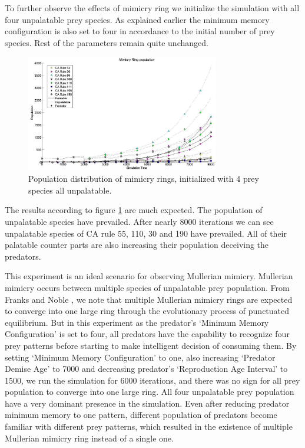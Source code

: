 \documentclass[letterpaper]{article}
\numberwithin{equation}{section}
\begin{document}
To further observe the effects of mimicry ring we initialize the simulation with all four unpalatable prey species. As explained earlier the minimum memory configuration is also set to four in accordance to the initial number of prey species. Rest of the parameters remain quite unchanged.

\begin{figure}[t!]
	\centering
	\includegraphics[width=0.75\textwidth]{../tex/images/simTime8k-4Prey-unp}
	\caption[Population distribution of mimicry rings(4 prey species all unpalatable)]{Population distribution of mimicry rings, initialized with 4 prey species all unpalatable.}
	\label{fig:plot-4-prey-unp}
\end{figure}

The results according to figure \ref{fig:plot-4-prey-unp} are much expected. The population of unpalatable species have prevailed. After nearly 8000 iterations we can see unpalatable species of CA rule 55, 110, 30 and 190 have prevailed. All of their palatable counter parts are also increasing their population deceiving the predators. 

This experiment is an ideal scenario for observing Mullerian mimicry. Mullerian mimicry occurs between multiple species of unpalatable prey population. From Franks and Noble \citep{franks2003}, we note that multiple Mullerian mimicry rings are expected to converge into one large ring through the evolutionary process of punctuated equilibrium. But in this experiment as the predator's `Minimum Memory Configuration' is set to four, all predators have the capability to recognize four prey patterns before starting to make intelligent decision of consuming them. By setting `Minimum Memory Configuration' to one, also increasing `Predator Demise Age' to 7000 and decreasing predator's `Reproduction Age Interval' to 1500, we run the simulation for 6000 iterations, and there was no sign for all prey population to converge into one large ring. All four unpalatable prey population have a very dominant presence in the simulation. Even after reducing predator minimum memory to one pattern, different population of predators become familiar with different prey patterns, which resulted in the existence of multiple Mullerian mimicry ring instead of a single one.
\end{document}
